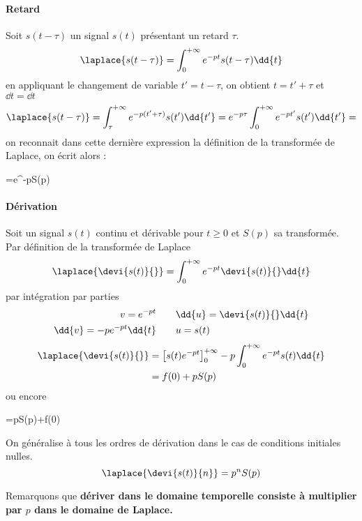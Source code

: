 \paragraph{Retard}
Soit $s(t-\tau)$ un signal $s(t)$ présentant un retard $\tau$.
$$
\laplace{s(t-\tau)}=\int_{0}^{+\infty} e^{-pt}s(t-\tau)\dd{t}
$$
en appliquant le changement de variable $t'=t-\tau$, on obtient $t=t'+\tau$ et $\dd{t}=\dd{t}$
$$
\laplace{s(t-\tau)}=\int_{\tau}^{+\infty} e^{-p(t'+\tau)}s(t')\dd{t'}=e^{-p\tau}\int_{0}^{+\infty} e^{-pt'}s(t')\dd{t'}=
$$
on reconnait dans cette dernière expression la définition de la transformée de Laplace, on écrit alors :
\begin{bequation}
    =e^{-p\tau}S(p)
\end{bequation}
\paragraph{Dérivation}
Soit un signal $s(t)$ continu et dérivable pour $t\ge0$ et $S(p)$ sa transformée.
Par définition de la transformée de Laplace 
$$
\laplace{\devi{s(t)}{}}=\int_{0}^{+\infty} e^{-pt}\devi{s(t)}{}\dd{t}
$$
par intégration par parties
\begin{align*}
    v=e^{-pt}\qquad&\dd{u}=\devi{s(t)}{}\dd{t}\\
    \dd{v}=-pe^{-pt}\dd{t}\qquad&u=s(t)
\end{align*}
\begin{align*}
    \laplace{\devi{s(t)}{}}&=\left[s(t)e^{-pt}\right]_0^{+\infty}-p\int_{0}^{+\infty} e^{-pt}s(t)\dd{t} \\
                           &=f(0)+pS(p)
\end{align*}
ou encore
\begin{bequation}
    =pS(p)+f(0)
\end{bequation}
On généralise à tous les ordres de dérivation dans le cas de conditions initiales nulles.
$$
\laplace{\devi{s(t)}{n}}=p^nS(p)
$$

Remarquons que \textbf{dériver dans le domaine temporelle consiste à multiplier par 
$p$ dans le domaine de Laplace.}
